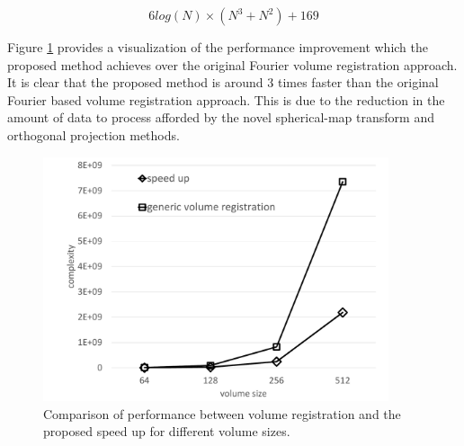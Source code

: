 \begin{equation} \label{eqn:FULLPERF2}
6log(N)\times (N^3 + N^2) + 169
\end{equation}

Figure \ref{fig:perfComp} provides a visualization of the performance improvement which the proposed method achieves over the original Fourier volume registration approach. It is clear that the proposed method is around 3 times faster
than the original Fourier based volume registration approach. This is due to the reduction in the amount of data to process afforded by the novel spherical-map transform and orthogonal projection methods.

\begin{figure}[t]
\centering
\includegraphics[width=4.0in]{images/ch2/perfcomp}
\caption{Comparison of performance between volume registration and the proposed speed up for different volume sizes.}
\label{fig:perfComp}
\end{figure}
